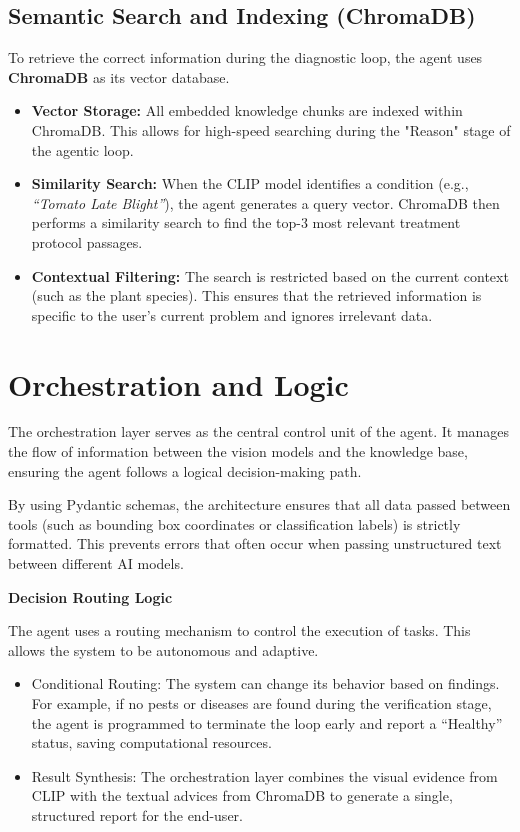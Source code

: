 \subsection{Semantic Search and Indexing (ChromaDB)}
To retrieve the correct information during the diagnostic loop, the agent uses \textbf{ChromaDB} as its vector database.

\begin{itemize}
	\item \textbf{Vector Storage:} All embedded knowledge chunks are indexed within ChromaDB. This allows for high-speed searching during the "Reason" stage of the agentic loop.
	\item \textbf{Similarity Search:} When the CLIP model identifies a condition (e.g., \textit{``Tomato Late Blight''}), the agent generates a query vector. ChromaDB then performs a similarity search to find the top-3 most relevant treatment protocol passages.
	\item \textbf{Contextual Filtering:} The search is restricted based on the current context (such as the plant species). This ensures that the retrieved information is specific to the user's current problem and ignores irrelevant data.
\end{itemize}

%
%

\section{Orchestration and Logic}
The orchestration layer serves as the central control unit of the agent. It manages the flow of information between the vision models and the knowledge base, ensuring the agent follows a logical decision-making path.

By using Pydantic schemas, the architecture ensures that all data passed between tools (such as bounding box coordinates or classification labels) is strictly formatted. This prevents errors that often occur when passing unstructured text between different AI models.

\textbf{Decision Routing Logic}

The agent uses a routing mechanism to control the execution of tasks. This allows the system to be autonomous and adaptive.

\begin{itemize}
	\item Conditional Routing: The system can change its behavior based on findings. For example, if no pests or diseases are found during the verification stage, the agent is programmed to terminate the loop early and report a ``Healthy'' status, saving computational resources.
	\item Result Synthesis: The orchestration layer combines the visual evidence from CLIP with the textual advices from ChromaDB to generate a single, structured report for the end-user.
\end{itemize}

